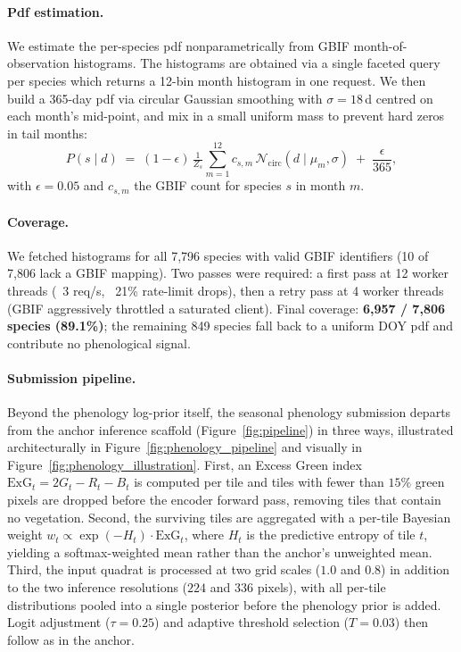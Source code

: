 \paragraph{Pdf estimation.} We estimate the per-species pdf nonparametrically from GBIF month-of-observation histograms. The histograms are obtained via a single faceted query per species
which returns a 12-bin month histogram in one request. We then build a 365-day pdf via circular Gaussian smoothing with $\sigma = 18$\,d centred on each month's mid-point, and mix in a small uniform mass to prevent hard zeros in tail months:
\begin{equation}
  P(s \mid d) \;=\; (1{-}\epsilon)\, \tfrac{1}{Z_s}\!\sum_{m=1}^{12} c_{s,m}\,\mathcal{N}_{\text{circ}}\!\left(d \mid \mu_m, \sigma\right) \;+\; \frac{\epsilon}{365},
\end{equation}
with $\epsilon{=}0.05$ and $c_{s,m}$ the GBIF count for species $s$ in month $m$.

\paragraph{Coverage.} We fetched histograms for all 7{,}796 species with valid GBIF identifiers (10 of 7{,}806 lack a GBIF mapping). Two passes were required: a first pass at 12 worker threads (~3 req/s, ~21\% rate-limit drops), then a retry pass at 4 worker threads (GBIF aggressively throttled a saturated client). Final coverage: \textbf{6{,}957 / 7{,}806 species (89.1\%)}; the remaining 849 species fall back to a uniform DOY pdf and contribute no phenological signal.

\paragraph{Submission pipeline.} Beyond the phenology log-prior itself, the seasonal phenology submission departs from the anchor inference scaffold (Figure~\ref{fig:pipeline}) in three ways, illustrated architecturally in Figure~\ref{fig:phenology_pipeline} and visually in Figure~\ref{fig:phenology_illustration}. First, an Excess Green index $\mathrm{ExG}_t = 2G_t - R_t - B_t$ is computed per tile and tiles with fewer than $15\%$ green pixels are dropped before the encoder forward pass, removing tiles that contain no vegetation. Second, the surviving tiles are aggregated with a per-tile Bayesian weight $w_t \propto \exp(-H_t)\cdot\mathrm{ExG}_t$, where $H_t$ is the predictive entropy of tile $t$, yielding a softmax-weighted mean rather than the anchor's unweighted mean. Third, the input quadrat is processed at two grid scales ($1.0$ and $0.8$) in addition to the two inference resolutions ($224$ and $336$ pixels), with all per-tile distributions pooled into a single posterior before the phenology prior is added. Logit adjustment ($\tau{=}0.25$) and adaptive threshold selection ($T{=}0.03$) then follow as in the anchor.

